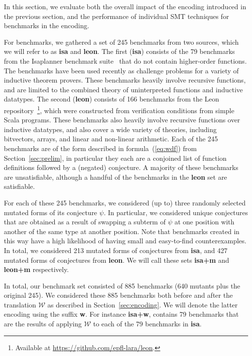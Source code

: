 \documentclass[runningheads,a4paper]{llncs}
\newcommand{\conv}{\mathcal{W}}
\begin{document}
In this section, we evaluate both 
the overall impact of the encoding introduced in the previous section, and
the performance of individual SMT techniques for benchmarks in the encoding.

For benchmarks, we gathered a set of 245 benchmarks from two sources, which we will refer to as {\bf isa} and {\bf leon}.
The first ({\bf isa}) consists of the 79 benchmarks from the Isaplanner benchmark suite~\cite{DBLP:conf/itp/JohanssonDB10} that do not contain higher-order functions.
The benchmarks have been used recently as challenge problems for a variety of inductive theorem provers.
These benchmarks heavily involve recursive functions, and are limited to the combined theory of uninterpreted functions and inductive datatypes.
The second ({\bf leon}) consists of 166 benchmarks from the Leon repository~\footnote{Available at \url{https://github.com/epfl-lara/leon}.},
which were constructed from verification conditions from simple Scala programs.
These benchmarks also heavily involve recursive functions over inductive datatypes, 
and also cover a wide variety of theories, including bitvectors, arrays, and linear and non-linear arithmetic.
Each of the 245 benchmarks are of the form described in formula~(\ref{eq:wdf}) from Section~\ref{sec:prelim},
in particular they each are a conjoined list of function definitions followed by a (negated) conjecture.
A majority of these benchmarks are unsatisfiable, although a handful of the benchmarks in the {\bf leon} set are satisfiable.

For each of these 245 benchmarks, we considered (up to) three randomly selected mutated forms of its conjecture $\psi$.
In particular, we considered unique conjectures that are obtained as a result of swapping a subterm of $\psi$ at one position
with another of the same type at another position.
Note that benchmarks created in this way have a high likelihood of having small and easy-to-find counterexamples.
In total, we considered 213 mutated forms of conjectures from {\bf isa}, and 427 mutated forms of conjectures from {\bf leon}.
We will call these sets {\bf isa+m} and {\bf leon+m} respectively.

In total, our benchmark set consisted of 885 benchmarks (640 mutants plus the original 245).
We considered these 885 benchmarks both before and after the translation $\conv$ as described in Section~\ref{sec:encoding}.
We will denote the latter encoding using the suffix {\bf w}.
For instance {\bf isa+w}, contains 79 benchmarks that are the results of applying $\conv$ to each of the 79 benchmarks in {\bf isa}.
\end{document}
